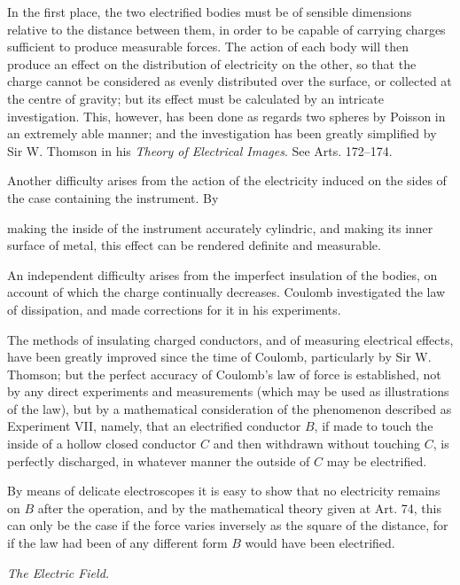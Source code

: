 \documentclass[11pt,a4paper]{article}
\begin{document}
In the first place, the two electrified bodies must be of sensible
dimensions relative to the distance between them, in order to be capable
of carrying charges sufficient to produce measurable forces. The action
of each body will then produce an effect on the distribution of
electricity on the other, so that the charge cannot be considered as
evenly distributed over the surface, or collected at the centre of
gravity; but its effect must be calculated by an intricate
investigation. This, however, has been done as regards two spheres by
Poisson in an extremely able manner; and the investigation has been
greatly simplified by Sir W. Thomson in his \textit{Theory of Electrical
Images}. See Arts. 172--174.

Another difficulty arises from the action of the electricity induced on
the sides of the case containing the instrument. By

\clearpage
\setcounter{footnote}{0}

making the inside of the instrument accurately cylindric, and making
its inner surface of metal, this effect can be rendered definite and
measurable.

An independent difficulty arises from the imperfect insulation of the
bodies, on account of which the charge continually decreases. Coulomb
investigated the law of dissipation, and made corrections for it in his
experiments.

The methods of insulating charged conductors, and of measuring
electrical effects, have been greatly improved since the time of
Coulomb, particularly by Sir W. Thomson; but the perfect accuracy of
Coulomb's law of force is established, not by any direct experiments
and measurements (which may be used as illustrations of the law), but
by a mathematical consideration of the phenomenon described as
Experiment VII, namely, that an electrified conductor \(B\), if made to
touch the inside of a hollow closed conductor \(C\) and then withdrawn
without touching \(C\), is perfectly discharged, in whatever manner the
outside of \(C\) may be electrified.

By means of delicate electroscopes it is easy to show that no
electricity remains on \(B\) after the operation, and by the
mathematical theory given at Art. 74, this can only be the case if the
force varies inversely as the square of the distance, for if the law
had been of any different form \(B\) would have been electrified.

\begin{center}
\textit{The Electric Field.}
\end{center}
\end{document}
